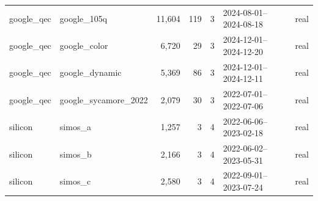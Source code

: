 \begin{tabular}{llrrrll}
google\_qec & google\_105q & 11,604 & 119 & 3 & 2024-08-01--2024-08-18 & real \\
google\_qec & google\_color & 6,720 & 29 & 3 & 2024-12-01--2024-12-20 & real \\
google\_qec & google\_dynamic & 5,369 & 86 & 3 & 2024-12-01--2024-12-11 & real \\
google\_qec & google\_sycamore\_2022 & 2,079 & 30 & 3 & 2022-07-01--2022-07-06 & real \\
silicon & simos\_a & 1,257 & 3 & 4 & 2022-06-06--2023-02-18 & real \\
silicon & simos\_b & 2,166 & 3 & 4 & 2022-06-02--2023-05-31 & real \\
silicon & simos\_c & 2,580 & 3 & 4 & 2022-09-01--2023-07-24 & real \\
\bottomrule
\end{tabular}
